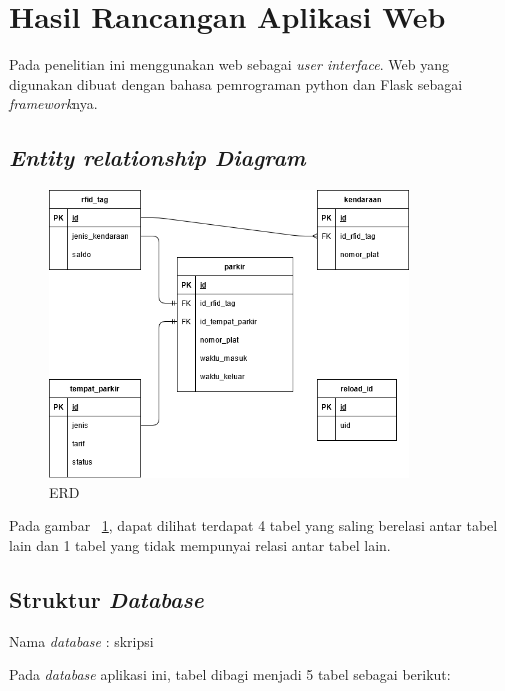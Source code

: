 
\section{Hasil Rancangan Aplikasi Web}
Pada penelitian ini menggunakan web sebagai \textit{user interface}. Web yang digunakan dibuat dengan bahasa pemrograman python dan Flask sebagai \textit{framework}nya.

\subsection{\textit{Entity relationship Diagram}}
\begin{figure} [H]
    \includegraphics[width=0.85\textwidth, center]{images/er diagram.png}
    \caption{ERD}
    \label{fig:erd}
\end{figure}

Pada gambar ~\ref{fig:erd}, dapat dilihat terdapat 4 tabel yang saling berelasi antar tabel lain dan 1 tabel yang tidak mempunyai relasi antar tabel lain.

\subsection{Struktur \textit{Database}}
Nama \textit{database} : skripsi

Pada \textit{database} aplikasi ini, tabel dibagi menjadi 5 tabel sebagai berikut:

